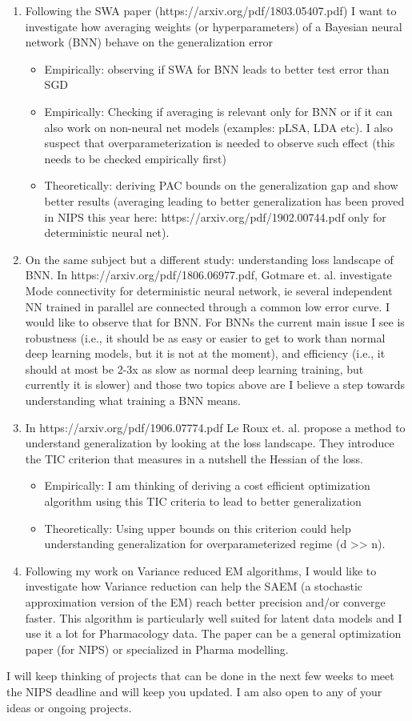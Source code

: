 \documentclass[11pt]{article}
\theoremstyle{plain}
\theoremstyle{plain}
\theoremstyle{definition}
\begin{document}
\begin{enumerate}
\item Following the SWA paper (https://arxiv.org/pdf/1803.05407.pdf) I want to investigate how averaging weights (or hyperparameters) of a Bayesian neural network (BNN) behave on the generalization error
\begin{itemize}
\item Empirically: observing if SWA for BNN leads to better test error than SGD
\item Empirically: Checking if averaging is relevant only for BNN or if it can also work on non-neural net models (examples: pLSA, LDA etc). I also suspect that overparameterization is needed to observe such effect (this needs to be checked empirically first)
\item Theoretically: deriving PAC bounds on the generalization gap and show better results (averaging leading to better generalization has been proved in NIPS this year here: https://arxiv.org/pdf/1902.00744.pdf only for deterministic neural net).
\end{itemize}
\item On the same subject but a different study: understanding loss landscape of BNN. In https://arxiv.org/pdf/1806.06977.pdf, Gotmare et. al. investigate Mode connectivity for deterministic neural network, ie several independent NN trained in parallel are connected through a common low error curve. I would like to observe that for BNN. For BNNs the current main issue I see is robustness (i.e., it should be as easy or easier to get to work than normal deep learning models, but it is not at the moment), and efficiency (i.e., it should at most be 2-3x as slow as normal deep learning training, but currently it is slower) and those two topics above are I believe a step towards understanding what training a BNN means.
\item In https://arxiv.org/pdf/1906.07774.pdf  Le Roux et. al. propose a method to understand generalization by looking at the loss landscape. They introduce the TIC criterion that measures in a nutshell the Hessian of the loss. 
\begin{itemize}
\item Empirically: I am thinking of deriving a cost efficient optimization algorithm using this TIC criteria to lead to better generalization
\item Theoretically: Using upper bounds on this criterion could help understanding generalization for overparameterized regime (d >> n).
\end{itemize}
\item Following my work on Variance reduced EM algorithms, I would like to investigate how Variance reduction can help the SAEM (a stochastic approximation version of the EM) reach better precision and/or converge faster. This algorithm is particularly well suited for latent data models and I use it a lot for Pharmacology data. The paper can be a general optimization paper (for NIPS) or specialized in Pharma modelling.
\end{enumerate}

I will keep thinking of projects that can be done in the next few weeks to meet the NIPS deadline and will keep you updated.
I am also open to any of your ideas or ongoing projects.





%
\newpage
\end{document}
